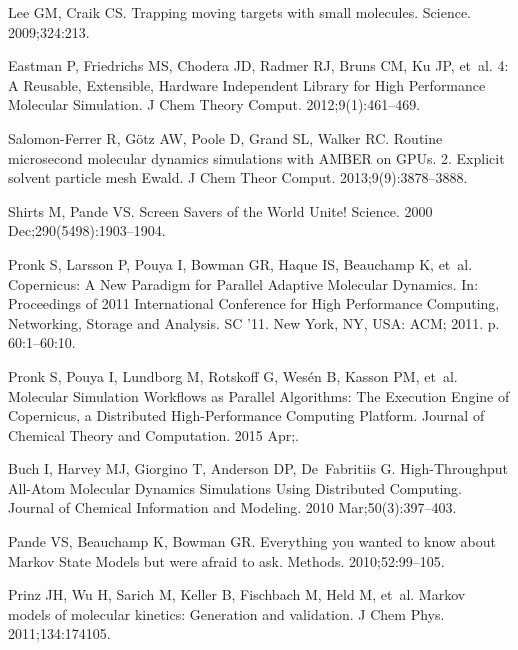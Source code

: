 \documentclass[10pt,letterpaper]{article}
\begin{document}
\begin{thebibliography}{100}

Lee GM, Craik CS.
\newblock Trapping moving targets with small molecules.
\newblock Science. 2009;324:213.

Eastman P, Friedrichs MS, Chodera JD, Radmer RJ, Bruns CM, Ku JP, et~al.
 4: A Reusable, Extensible, Hardware Independent Library for
  High Performance Molecular Simulation.
\newblock J Chem Theory Comput. 2012;9(1):461--469.

Salomon-Ferrer R, G\"{o}tz AW, Poole D, Grand SL, Walker RC.
\newblock Routine microsecond molecular dynamics simulations with {AMBER} on
  {GPUs}. 2. Explicit solvent particle mesh {Ewald}.
\newblock J Chem Theor Comput. 2013;9(9):3878--3888.

Shirts M, Pande VS.
\newblock Screen {Savers} of the {World} {Unite}!
\newblock Science. 2000 Dec;290(5498):1903--1904.

Pronk S, Larsson P, Pouya I, Bowman GR, Haque IS, Beauchamp K, et~al.
\newblock Copernicus: {A} {New} {Paradigm} for {Parallel} {Adaptive}
  {Molecular} {Dynamics}.
\newblock In: Proceedings of 2011 {International} {Conference} for {High}
  {Performance} {Computing}, {Networking}, {Storage} and {Analysis}. {SC} '11.
  New York, NY, USA: ACM; 2011. p. 60:1--60:10.

Pronk S, Pouya I, Lundborg M, Rotskoff G, Wes\'{e}n B, Kasson PM, et~al.
\newblock Molecular {Simulation} {Workflows} as {Parallel} {Algorithms}: {The}
  {Execution} {Engine} of {Copernicus}, a {Distributed} {High}-{Performance}
  {Computing} {Platform}.
\newblock Journal of Chemical Theory and Computation. 2015 Apr;.

Buch I, Harvey MJ, Giorgino T, Anderson DP, De~Fabritiis G.
\newblock High-{Throughput} {All}-{Atom} {Molecular} {Dynamics} {Simulations}
  {Using} {Distributed} {Computing}.
\newblock Journal of Chemical Information and Modeling. 2010
  Mar;50(3):397--403.

Pande VS, Beauchamp K, Bowman GR.
\newblock Everything you wanted to know about {Markov State Models} but were
  afraid to ask.
\newblock Methods. 2010;52:99--105.

Prinz JH, Wu H, Sarich M, Keller B, Fischbach M, Held M, et~al.
\newblock Markov models of molecular kinetics: Generation and validation.
\newblock J Chem Phys. 2011;134:174105.


\end{thebibliography}
\end{document}

